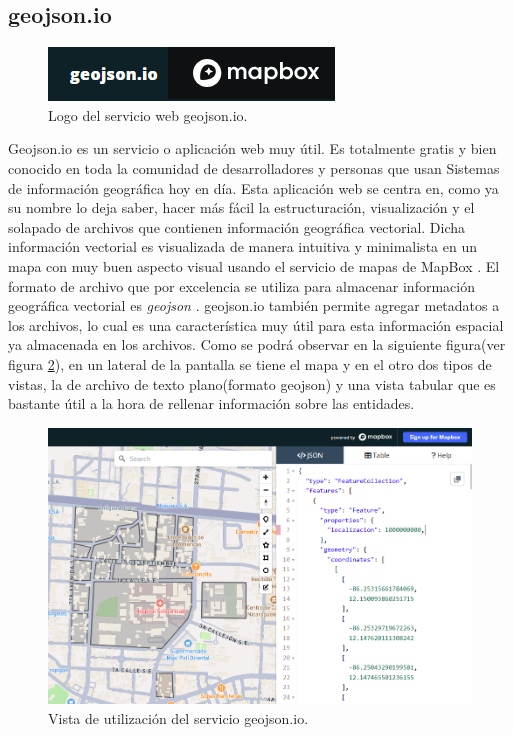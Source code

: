 \subsection{geojson.io}
\begin{figure}[h]
    \centering
    \includegraphics[scale=1.5]{Graphics/geojson.io_logo.png}
    \caption{Logo del servicio web geojson.io.}
    \label{fig:figura3}
\end{figure}
Geojson.io \cite{geojson.io} es un servicio o aplicación web muy útil. Es totalmente gratis y bien conocido en toda la comunidad
de desarrolladores y personas que usan Sistemas de información geográfica hoy en día.
Esta aplicación web se centra en, como ya su
nombre lo deja saber, hacer más fácil la estructuración, visualización y el solapado de archivos que contienen información geográfica vectorial.
Dicha información vectorial es visualizada de manera intuitiva y minimalista en un mapa con muy buen aspecto visual usando el servicio
de mapas de MapBox \cite{mapbox}. El formato de archivo que por excelencia se utiliza para almacenar información geográfica vectorial es \textit{geojson} \cite{geojsonOfficialPage}.
geojson.io también permite agregar metadatos a los archivos, lo cual es una característica muy útil para esta información espacial ya almacenada en los archivos.
Como se podrá observar en la siguiente figura(ver figura \ref{fig:figura4}), en un lateral de la pantalla se tiene el mapa y en el otro dos tipos de vistas, la de archivo de texto plano(formato geojson)
y una vista tabular que es bastante útil a la hora de rellenar información sobre las entidades.
\begin{figure}[h]
    \centering
    \includegraphics[scale=0.5]{Graphics/geojson.io_description.png}
    \caption{Vista de utilización del servicio geojson.io.}
    \label{fig:figura4}
\end{figure}
